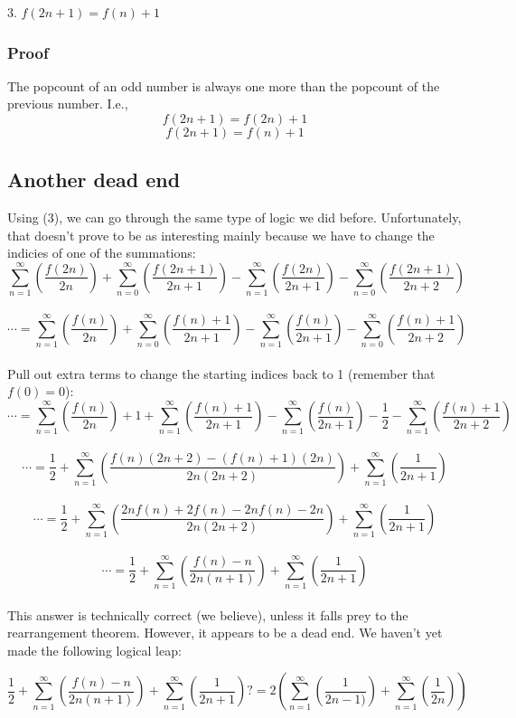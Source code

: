 \documentclass{article}
\begin{document}
3. $f(2n + 1)=f(n) + 1$

\subsubsection{Proof}

The popcount of an odd number is always one more than the popcount of the previous number. I.e.,
$$f(2n + 1)=f(2n)+1$$
$$f(2n + 1)=f(n)+1$$

\subsection{Another dead end}

Using (3), we can go through the same type of logic we did before. Unfortunately, that doesn't prove to be as interesting mainly because we have to change the indicies of one of the summations:
$$\sum_{n=1}^\infty \left( \frac{f(2n)}{2n} \right)+\sum_{n=0}^\infty \left( \frac{f(2n+1)}{2n+1} \right)
-\sum_{n=1}^\infty \left( \frac{f(2n)}{2n+1} \right)-\sum_{n=0}^\infty \left( \frac{f(2n+1)}{2n+2} \right)$$\\
$$\cdots =\sum_{n=1}^\infty \left( \frac{f(n)}{2n} \right)+\sum_{n=0}^\infty \left( \frac{f(n)+1}{2n+1} \right)
-\sum_{n=1}^\infty \left( \frac{f(n)}{2n+1} \right)-\sum_{n=0}^\infty \left( \frac{f(n)+1}{2n+2} \right)$$\\
Pull out extra terms to change the starting indices back to 1 (remember that $f(0)=0$):
$$\cdots =\sum_{n=1}^\infty \left( \frac{f(n)}{2n} \right)+1+\sum_{n=1}^\infty \left( \frac{f(n)+1}{2n+1} \right)
-\sum_{n=1}^\infty \left( \frac{f(n)}{2n+1} \right)-\frac{1}{2}-\sum_{n=1}^\infty \left( \frac{f(n)+1}{2n+2} \right)$$\\
$$\cdots =\frac{1}{2}+\sum_{n=1}^\infty \left( \frac{f(n)(2n+2)-(f(n)+1)(2n)}{2n(2n+2)} \right)+\sum_{n=1}^\infty \left( \frac{1}{2n+1} \right)$$\\
$$\cdots =\frac{1}{2}+\sum_{n=1}^\infty \left( \frac{2nf(n)+2f(n)-2nf(n)-2n}{2n(2n+2)} \right)+\sum_{n=1}^\infty \left( \frac{1}{2n+1} \right)$$\\
$$\cdots =\frac{1}{2}+\sum_{n=1}^\infty \left( \frac{f(n)-n}{2n(n+1)} \right)+\sum_{n=1}^\infty \left( \frac{1}{2n+1} \right)$$\\

This answer is technically correct (we believe), unless it falls prey to the rearrangement theorem. However, it appears to be a dead end. We haven't yet made the following logical leap:

$$\frac{1}{2}+\sum_{n=1}^\infty \left( \frac{f(n)-n}{2n(n+1)} \right)+\sum_{n=1}^\infty \left( \frac{1}{2n+1} \right)?=2 \left( \sum_{n=1}^\infty \left( \frac{1}{2n-1)} \right)+\sum_{n=1}^\infty \left( \frac{1}{2n} \right) \right)$$\\
\end{document}
